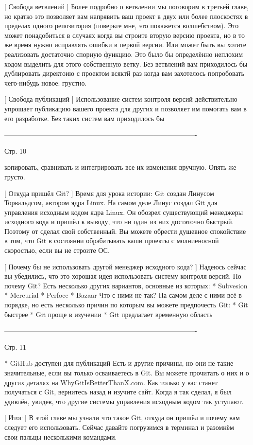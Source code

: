 [ Свобода ветвлений ]
Более подробно о ветвлении мы поговорим в третьей главе, но кратко это позволяет вам
напрявить ваш проект в двух или более плоскостях в пределах одного репозитория
(поверьте мне, это покажется волшебством). Это может понадобиться в случаях когда
вы строите вторую версию проекта, но в то же время нужно исправлять ошибки в первой 
версии. Или может быть вы хотите реализовать достаточно спорную функцию. Это было бы
определённо неплохим ходом выделить для этого собственную ветку. Без ветвлений вам 
приходилось бы дублировать директоию с проектом всяктй раз когда вам захотелось
попробовать чего-нибудь новое: грустно.

[ Свобода публикаций ]
Использование систем контроля версий действительно упрощает публикацию вашего проекта
для других и позволяет им помогать вам в его разработке. Без таких систем вам
приходилось бы 

-------------------------------------------------------------------------------------

Стр. 10

копировать, сравнивать и интегрировать все их изменения вручную. Опять
же грусто.

[ Откуда пришёл Git? ]
Время для урока истории: Git создан Линусом Торвальдсом, автором ядра Linux. На самом
деле Линус создал Git для управления исходным кодом ядра Linux. Он обозрел
существующий менеджеры исходного кода и пришёл к выводу, что ни один из них
достаточно быстрый. Поэтому от сделал свой собственный. Вы можете обрести душевное
спокойствие в том, что Git в состоянии обрабатывать ваши проекты с молниеносной
скоростью, если вы не строите ОС.

[ Почему бы не использовать другой менеджер исходного кода? ]
Надеюсь сейчас вы убедились, что это хорошая идея использовать систему контроля
версий. Но почему Git? Есть несколько других вариантов, основные из которых:
    * Subvesion
    * Mercurial
    * Perfoce
    * Bazaar
Что с ними не так? На самом деле с ними всё в порядке, но есть несколько причин по
которым вы можете предпочесть Git:
    * Git быстрее
    * Git проще в изучении
    * Git предлагает временную область

-------------------------------------------------------------------------------------

Стр. 11

    * GitHub доступен для публикаций
 Есть и другие причины, но они не такие значительные, если вы только осваиваетесь в
 Git. Вы можете прочитать о них и о других деталях на WhyGitIsBetterThanX.com. Как
 только у вас станет получаться с Git, вернитесь назад и изучите сайт. Когда я так
 сделал, я был удивлён, увидев, что другие системы управления исходным кодом так 
 уступают.

 [ Итог ]
 В этой главе мы узнали что такое Git, откуда он пришёл и почему вам следует его 
 использовать. Сейчас давайте погрузимся в терминал и разомнём свои пальцы 
 несколькими командами.